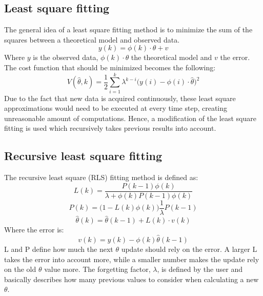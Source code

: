 \subsection{Least square fitting}
The general idea of a least square fitting method is to minimize the sum of the squares between a theoretical model and observed data. 
\begin{equation} 
	y(k) = \phi(k)\cdot\theta + v
	\label{eq:least_square}
\end{equation}
Where $ y $ is the observed data, $ \phi(k)\cdot\theta $ the theoretical model and $ v $ the error. The cost function that should be minimized becomes the following:
\begin{equation}
	V(\hat{\theta}, k) = \dfrac{1}{2} \sum_{i=1}^{k} \lambda^{k-i}\Big(y(i) - \phi(i)\cdot\hat\theta \Big)^2
\end{equation}
Due to the fact that new data is acquired continuously, these least square approximations would need to be executed at every time step, creating unreasonable amount of computations. Hence, a modification of the least square fitting is used which recursively takes previous results into account.

\subsection{Recursive least square fitting}
The recursive least square (RLS) fitting method is defined as:
\begin{equation}
	L(k) =\dfrac{ P(k-1)\phi (k)}{\lambda + \phi (k) P(k-1)\phi(k)} 
\label{eq:RLS1}
\end{equation}
\begin{equation}
	P(k) = \Big( 1 - L(k)\phi (k) \Big) \dfrac{1}{\lambda} P(k-1)
\label{eq:RLS2}
\end{equation}
\begin{equation}
\hat \theta (k) = \hat \theta (k-1) + L(k) \cdot v(k)
\label{eq:RLS3}
\end{equation}
Where the error is:
\begin{equation}
	v(k) = y(k) - \phi (k) \hat \theta (k-1)
	\label{eq:RLS4}
\end{equation}
L and P define how much the next $ \theta $ update should rely on the error. A larger L takes the error into account more, while a smaller number makes the update rely on the old $ \theta $ value more. The forgetting factor, $ \lambda $, is defined by the user and basically describes how many previous values to consider when calculating a new $ \theta $.

